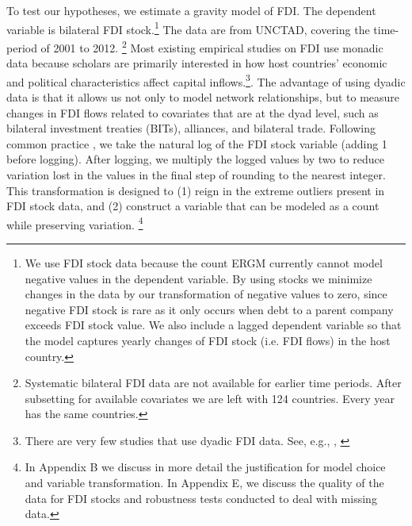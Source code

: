 \documentclass[reqno,onecolumn,letterpaper,12pt]{article}
\begin{document}
To test our hypotheses, we estimate a gravity model of FDI. %
The dependent variable is bilateral FDI stock.\footnote{ We use FDI stock data because the count ERGM currently cannot model negative values in the dependent variable. By using stocks we minimize changes in the data by our transformation of negative values to zero, since negative FDI stock is rare as it only occurs when debt to a parent company exceeds FDI stock value. We also include a lagged dependent variable so that the model captures yearly changes of FDI stock (i.e. FDI flows) in the host country.} The data are from UNCTAD, covering the time-period of 2001 to 2012.%
\footnote{Systematic bilateral FDI data are not available for earlier time periods. After subsetting for available covariates we are left with 124 countries. Every year has the same countries.} Most existing empirical studies on FDI use monadic data because scholars are primarily interested in how host countries' economic and political characteristics affect capital inflows.\footnote{There are very few studies that use dyadic FDI data. See, e.g.,  \citet{Leblang:2010}, \citet{Li_Vashchilko:2010}}.  The advantage of using dyadic data is that it allows us not only to model network relationships, but to measure changes in FDI flows related to covariates that are at the dyad level, such as bilateral investment treaties (BITs), alliances, and bilateral trade. Following common practice \citep[e.g.,][]{hyun2006quality,benassy2007institutional}, we take the natural log of the FDI stock variable (adding 1 before logging). After logging, we multiply the logged values by two to reduce variation lost in the values in the final step of rounding to the nearest integer. This transformation is designed to (1) reign in the extreme outliers present in FDI stock data, and (2) construct a variable that can be modeled as a count while preserving variation. \footnote{In Appendix B we discuss in more detail the justification for model choice and variable transformation. In Appendix E, we discuss the quality of the data for FDI stocks and robustness tests conducted to deal with missing data.}

\end{document}

